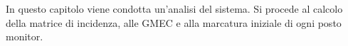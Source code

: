 In questo capitolo viene condotta un'analisi del sistema. Si procede al calcolo della matrice di incidenza, alle GMEC e alla marcatura iniziale di ogni posto monitor.